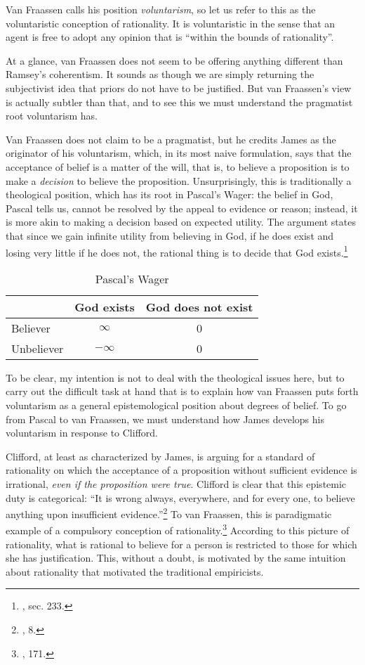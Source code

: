 Van Fraassen calls his position \emph{voluntarism}, so let us refer to this as the voluntaristic conception of rationality. It is voluntaristic in the
sense that an agent is free to adopt any opinion that is ``within the
bounds of rationality''.

At a glance, van Fraassen does not seem to be offering anything
different than Ramsey's coherentism. It sounds as though we are simply
returning the subjectivist idea that priors do not have to be justified.
But van Fraassen's view is actually subtler than that, and to see this
we must understand the pragmatist root voluntarism has.

Van Fraassen does not claim to be a pragmatist, but he credits James as
the originator of his voluntarism, which, in its most naive formulation,
says that the acceptance of belief is a matter of the will, that is, to
believe a proposition is to make a \emph{decision} to believe the
proposition. Unsurprisingly, this is traditionally a theological
position, which has its root in Pascal's
Wager: the belief in God,
Pascal tells us, cannot be resolved by the appeal to evidence or reason;
instead, it is more akin to making a decision based on expected utility.
The argument states that since we gain infinite utility from believing in God, if he does exist and
losing very little if he does not, the rational thing is
to decide that God exists.\footnote{\cite{pascal}, sec. 233.}

	\begin{table}[h]\label{pascalswager}
	\centering
	  \caption{Pascal's Wager}
  \begin{tabular}{l|cc}
    & God exists& God does not exist\\
    \hline
    Believer& $\infty$  & 0\\
    Unbeliever&$-\infty$ &0
  \end{tabular}

  
\end{table}

To be clear, my intention is not to deal with the theological issues
here, but to carry out the difficult task at hand that is to explain how van Fraassen puts forth voluntarism as a general epistemological position about
degrees of belief. To go from Pascal to van Fraassen, we must understand
how James develops his voluntarism in response to Clifford.

Clifford, at least as characterized by James, is arguing for a standard
of rationality on which the acceptance of a proposition without
sufficient evidence is irrational, \emph{even if the proposition were
true}. Clifford is clear that this epistemic duty is categorical: ``It
is wrong always, everywhere, and for every one, to believe anything upon
insufficient evidence.''\footnote{\cite{jameswill}, 8.} To van
Fraassen, this is paradigmatic example of a compulsory conception of
rationality.\footnote{\cite{bvflaws}, 171.}
According to this picture of rationality, what is rational to believe
for a person is restricted to those for which she has justification. This, without a
doubt, is motivated by the same intuition about rationality that motivated
the traditional empiricists.

